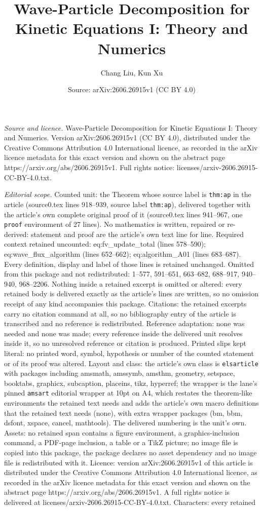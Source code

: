 \documentclass[10pt,a4paper]{amsart}
\title[Wave-Particle Decomposition for Kinetic Equations I: Theory ]{Wave-Particle Decomposition for Kinetic Equations I: Theory and Numerics}
\author{Chang Liu, Kun Xu}
\date{Source: arXiv:2606.26915v1 (CC BY 4.0)}
\begin{document}
\maketitle

\noindent\emph{Source and licence.} Wave-Particle Decomposition for Kinetic Equations I: Theory and Numerics. Version arXiv:2606.26915v1 (CC BY 4.0), distributed under the Creative Commons Attribution 4.0 International licence, as recorded in the arXiv licence metadata for this exact version and shown on the abstract page https://arxiv.org/abs/2606.26915v1. Full rights notice: licenses/arxiv-2606.26915-CC-BY-4.0.txt.\par\smallskip

\noindent\textit{Editorial scope.} Counted unit: the Theorem whose source label is \texttt{thm:ap} in the article (source0.tex lines 918--939, source label \texttt{thm:ap}), delivered together with the article's own complete original proof of it (source0.tex lines 941--967, one \texttt{proof} environment of 27 lines). No mathematics is written, repaired or re-derived: statement and proof are the article's own text line for line. Required context retained uncounted: eq:fv\_update\_total (lines 578--590); eq:wave\_flux\_algorithm (lines 652--662); eq:algorithm\_A01 (lines 683--687). Every definition, display and label of those lines is retained unchanged. Omitted from this package and not redistributed: 1--577, 591--651, 663--682, 688--917, 940--940, 968--2206. Nothing inside a retained excerpt is omitted or altered: every retained body is delivered exactly as the article's lines are written, so no omission receipt of any kind accompanies this package. Citations: the retained excerpts carry no citation command at all, so no bibliography entry of the article is transcribed and no reference is redistributed. Reference adaptation: none was needed and none was made; every reference inside the delivered unit resolves inside it, so no unresolved reference or citation is produced. Printed slips kept literal: no printed word, symbol, hypothesis or number of the counted statement or of its proof was altered. Layout and class: the article's own class is \texttt{elsarticle} with packages including amsmath, amssymb, amsthm, geometry, setspace, booktabs, graphicx, subcaption, placeins, tikz, hyperref; the wrapper is the lane's pinned \texttt{amsart} editorial wrapper at 10pt on A4, which restates the theorem-like environments the retained text needs and adds the article's own macro definitions that the retained text needs (none), with extra wrapper packages (bm, bbm, dsfont, xspace, cancel, mathtools). The delivered numbering is the unit's own. Assets: no retained span contains a figure environment, a graphics-inclusion command, a PDF-page inclusion, a table or a TikZ picture; no image file is copied into this package, the package declares no asset dependency and no image file is redistributed with it. Licence: version arXiv:2606.26915v1 of this article is distributed under the Creative Commons Attribution 4.0 International licence, as recorded in the arXiv licence metadata for this exact version and shown on the abstract page https://arxiv.org/abs/2606.26915v1. A full rights notice is delivered at licenses/arxiv-2606.26915-CC-BY-4.0.txt. Characters: every retained 
\end{document}

